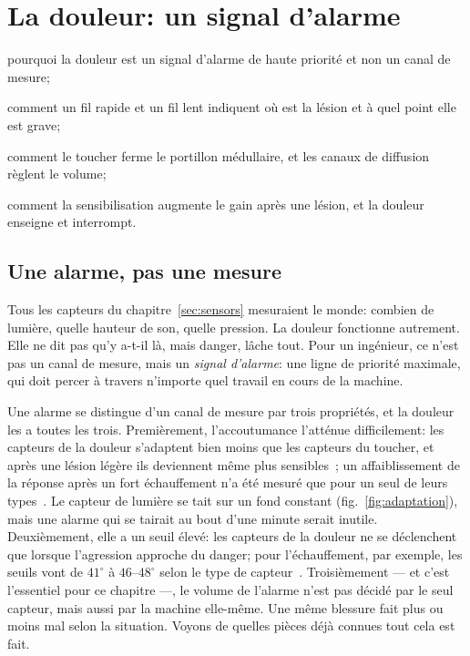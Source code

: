 \chapter{La douleur: un signal d'alarme}
\label{sec:pain}
\begin{chaptergoals}
\item pourquoi la douleur est un signal d'alarme de haute priorité et non un canal de mesure;
\item comment un fil rapide et un fil lent indiquent où est la lésion et à quel point elle est grave;
\item comment le toucher ferme le portillon médullaire, et les canaux de diffusion règlent le volume;
\item comment la sensibilisation augmente le gain après une lésion, et la douleur enseigne et interrompt.
\end{chaptergoals}

\section{Une alarme, pas une mesure}

Tous les capteurs du chapitre~\ref{sec:sensors} mesuraient le monde: combien de lumière, quelle hauteur de son, quelle pression. La douleur fonctionne autrement. Elle ne dit pas \og qu'y a-t-il là\fg{}, mais \og danger, lâche tout\fg{}. Pour un ingénieur, ce n'est pas un canal de mesure, mais un \emph{signal d'alarme}: une ligne de priorité maximale, qui doit percer à travers n'importe quel travail en cours de la machine.

Une alarme se distingue d'un canal de mesure par trois propriétés, et la douleur les a toutes les trois. Premièrement, l'accoutumance l'atténue difficilement: les capteurs de la douleur s'adaptent bien moins que les capteurs du toucher, et après une lésion légère ils deviennent même plus sensibles~\cite{LaMotte1982hyper}; un affaiblissement de la réponse après un fort échauffement n'a été mesuré que pour un seul de leurs types~\cite{Treede1995heat}. Le capteur de lumière se tait sur un fond constant (fig.~\ref{fig:adaptation}), mais une alarme qui se tairait au bout d'une minute serait inutile. Deuxièmement, elle a un seuil élevé: les capteurs de la douleur ne se déclenchent que lorsque l'agression approche du danger; pour l'échauffement, par exemple, les seuils vont de $41^\circ$ à $46$--$48^\circ$ selon le type de capteur~\cite{Treede1995heat, Weidner1999cfib}. Troisièmement --- et c'est l'essentiel pour ce chapitre ---, le volume de l'alarme n'est pas décidé par le seul capteur, mais aussi par la machine elle-même. Une même blessure fait plus ou moins mal selon la situation. Voyons de quelles pièces déjà connues tout cela est fait.


